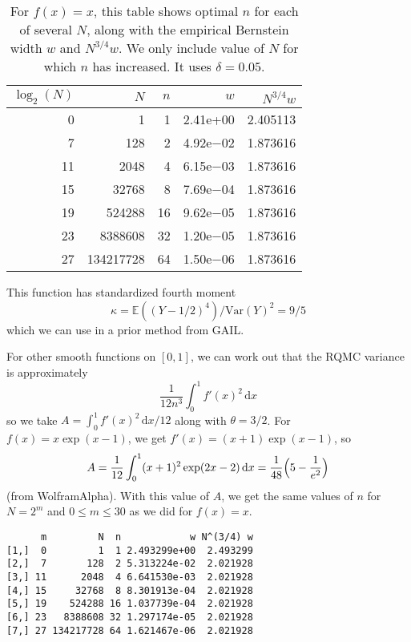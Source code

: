 \documentclass{article}
\renewcommand{\le}{\leqslant}
\newcommand{\e}{\mathbb{E}}
\newcommand{\var}{\mathrm{Var}}
\newcommand{\rd}{\,\mathrm{d}}
\begin{document}
\begin{table}\centering
\begin{tabular}{rrrrr}
\toprule
$\log_2(N)$&         $N$ & $n$    &    $w$ &$N^{3/4}w$\\
\midrule 
 0&         1  &1& 2.41e+00 & 2.405113\\
 7&       128  &2& 4.92e$-$02 & 1.873616\\
11&      2048  &4& 6.15e$-$03 & 1.873616\\
15&     32768  &8& 7.69e$-$04 & 1.873616\\
19&    524288 &16& 9.62e$-$05 & 1.873616\\
23&   8388608 &32& 1.20e$-$05 & 1.873616\\
27& 134217728 &64& 1.50e$-$06 & 1.873616\\
\bottomrule
\end{tabular}
\caption{\label{tab:forx} For $f(x)=x$, this table shows optimal
$n$ for each of several $N$, along with the empirical Bernstein
width $w$ and $N^{3/4}w$. We only include value of $N$ for which
$n$ has increased. It uses $\delta = 0.05$.
}
\end{table}



This function has standardized fourth moment
$$
\kappa = \e((Y-1/2)^4)/\var(Y)^2 = 9/5
$$
which we can use in a prior method from GAIL.

For other smooth functions on $[0,1]$, we can work out that
the RQMC variance is approximately
$$
\frac1{12n^3}\int_0^1 f'(x)^2\rd x
$$
so we take $A = \int_0^1f'(x)^2\rd x/12$ along with $\theta=3/2$.
For $f(x) = x\exp(x-1)$, we get $f'(x) = (x+1)\exp(x-1)$, so
$$
A =\frac1{12}\int_0^1 (x+1)^2\exp(2x-2)\rd x=\frac1{48}\Bigl(5-\frac{1}{e^2}\Bigr)
$$
(from WolframAlpha). With this value of $A$, we get the same values of $n$ for $N=2^m$ and $0\le m\le 30$ as we did for $f(x)=x$.
\begin{verbatim}
      m         N  n            w N^(3/4) w
[1,]  0         1  1 2.493299e+00  2.493299
[2,]  7       128  2 5.313224e-02  2.021928
[3,] 11      2048  4 6.641530e-03  2.021928
[4,] 15     32768  8 8.301913e-04  2.021928
[5,] 19    524288 16 1.037739e-04  2.021928
[6,] 23   8388608 32 1.297174e-05  2.021928
[7,] 27 134217728 64 1.621467e-06  2.021928
\end{verbatim}
\end{document}
